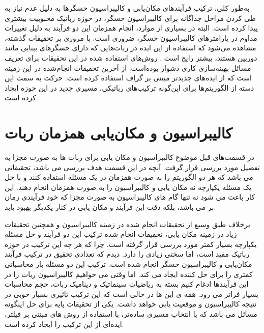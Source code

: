 به‌طور کلی، ترکیب فرآیندهای مکان‌یابی و کالیبراسیون حسگرها به دلیل عدم نیاز به طی کردن مراحل جداگانه برای کالیبراسیون حسگر، در حوزه رباتیک محبوبیت بیشتری پیدا کرده است. البته در بسیاری از موارد، انجام همزمان این دو فرآیند به دلیل تغییرات مداوم در پارامترهای کالیبراسیون حسگر، ضروری است. با مروری بر تحقیقات گذشته، مشاهده می‌شود که استفاده از این ایده در ربات‌هایی که دارای حسگرهای بینایی مانند دوربین هستند، بیشتر رایج است
\cite{zhou2014simultaneous, foxlin2002generalized}. 
روش‌های استفاده شده در این تحقیقات برای تعریف مسائل بهینه‌سازی کاری دشوار بوده‌است. 
\cite{reinke2019factor}
از آخرین تحقیقات انجام‌شده در این زمینه است که از ایده‌های جدیدتر مبتنی بر گراف استفاده کرده است. حرکت به سمت این دسته از الگوریتم‌ها برای این‌گونه ترکیب‌های رباتیکی، مسیری جدید در این حوزه ایجاد کرده است.
 
 
 
 
 
 
 
 
 
 
 
 
 
 
 
 
\section{کالیبراسیون و مکان‌یابی همزمان ربات}

در قسمت‌های قبل موضوع کالیبراسیون و مکان یابی برای ربات ها به صورت مجزا به تفصیل مورد بررسی قرار گرفت. آنچه در این قسمت هدف بررسی می باشد، تحقیقاتی می باشد که هر دو الگوریتم را به صورت همزمان در یک مسئله استفاده کنند و با حل یک مسئله یکپارچه نه مکان یابی و کالیبراسیون را به صورت همزمان انجام دهند. این کار باعث می شود نه تنها گام های کالیبراسیون به صورت مجزا که خود فرآیندی زمان بر می باشد، بلکه دقت این فرآیند و مکان یابی در کنار یکدیگر بهبود یابد. 

برخلاف طیق وسیع از تحقیقات انجام شده در زمینه کالیبراسیون و همچنین تحقیقات زیاد در زمینه مکان یابی، تحقیقات انجام شده ترکیب این دو فرآیند و حل مسئله یکپارچه بسیار کمتر مورد بررسی قرار گرفته است. چرا که هر چه این ترکیب در حوزه رباتیک مفید است، اما سختی زیادی را دارد. دیدم که تعدادی تحقیق در ترکیب فرآیند مکان‌یابی و کالیبراسیون حسگر انجام شده است. ترکیب این دو مسئله بار محاسباتی کمتری را برای حل کننده ایجاد می کند. اما وقتی می خواهیم کالیبراسیون ربات را در این فرآیندها ادغام کنیم بسته به ریاضیات سینماتیک و دینامیک ربات، حجم محاسبات بسیار فراتر می رود. همه ی این ها در حالی است که این ترکیب تاثیری بسیار خوبی در نتیجه کالیبراسیون و موقعیت یابی خواهد داشت. 
\cite{kummerle2011simultaneous}
یکی از تحقیقات پایه برای حل اینگونه مسائل می باشد که با انتخاب مسیری ساده‌تر، با استفاده از روش های مبنتی بر فیلتر، ایده‌ای از این ترکیب را ایجاد کرده است. 


